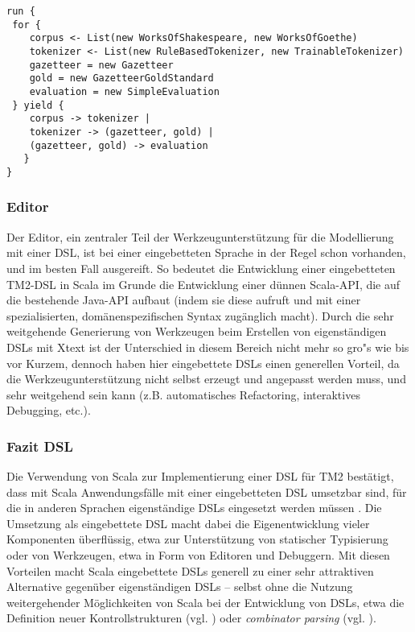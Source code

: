 \documentclass[abstracton, 12pt]{scrartcl}
\begin{document}
\begin{lstlisting}[float, label=sample-exp, caption={Beispiel für Experimentserie in der Scala-DSL}]
run { 
 for {
    corpus <- List(new WorksOfShakespeare, new WorksOfGoethe)
    tokenizer <- List(new RuleBasedTokenizer, new TrainableTokenizer)
    gazetteer = new Gazetteer
    gold = new GazetteerGoldStandard
    evaluation = new SimpleEvaluation
 } yield {
    corpus -> tokenizer |
    tokenizer -> (gazetteer, gold) |
    (gazetteer, gold) -> evaluation 
   }
}
\end{lstlisting}

\subsubsection{Editor}

Der Editor, ein zentraler Teil der Werkzeugunterstützung für die Modellierung mit einer DSL, ist bei einer eingebetteten Sprache in der Regel schon vorhanden, und im besten Fall ausgereift. So bedeutet die Entwicklung einer eingebetteten TM2-DSL in Scala im Grunde die Entwicklung einer dünnen Scala-API, die auf die bestehende Java-API aufbaut (indem sie diese aufruft und mit einer spezialisierten, domänenspezifischen Syntax zugänglich macht). Durch die sehr weitgehende Generierung von Werkzeugen beim Erstellen von eigenständigen DSLs mit Xtext ist der Unterschied in diesem Bereich nicht mehr so gro"s wie bis vor Kurzem, dennoch haben hier eingebettete DSLs einen generellen Vorteil, da die Werkzeugunterstützung nicht selbst erzeugt und angepasst werden muss, und sehr weitgehend sein kann (z.B. automatisches Refactoring, interaktives Debugging, etc.).

\subsubsection{Fazit DSL} \label{dsl-fazit}

Die Verwendung von Scala zur Implementierung einer DSL für TM2 bestätigt, dass mit Scala Anwendungsfälle mit einer eingebetteten DSL umsetzbar sind, für die in anderen Sprachen eigenständige DSLs eingesetzt werden müssen \citep[447]{OderskyEtAl2008}. Die Umsetzung als eingebettete DSL macht dabei die Eigenentwicklung vieler Komponenten überflüssig, etwa zur Unterstützung von statischer Typisierung oder von Werkzeugen, etwa in Form von Editoren und Debuggern. Mit diesen Vorteilen macht Scala eingebettete DSLs generell zu einer sehr attraktiven Alternative gegenüber eigenständigen DSLs -- selbst ohne die Nutzung weitergehender Möglichkeiten von Scala bei der Entwicklung von DSLs, etwa die Definition neuer Kontrollstrukturen (vgl. \citealt[161ff.]{OderskyEtAl2008}) oder \emph{combinator parsing} (vgl. \citealt[619ff.]{OderskyEtAl2008}).
\end{document}
